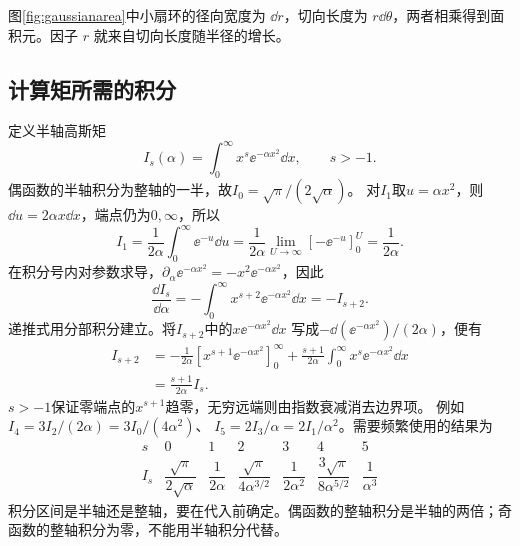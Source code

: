 图\ref{fig:gaussianarea}中小扇环的径向宽度为 $\dd r$，切向长度为 $r\dd\theta$，两者相乘得到面积元。因子 $r$ 就来自切向长度随半径的增长。

\subsection{计算矩所需的积分}
\label{th:integrals}
定义半轴高斯矩
\[
 I_s(\alpha)=\int_0^\infty x^s\ee^{-\alpha x^2}\dd x,\qquad s>-1.
\]
偶函数的半轴积分为整轴的一半，故$I_0=\sqrt\pi/(2\sqrt\alpha)$。
对$I_1$取$u=\alpha x^2$，则$\dd u=2\alpha x\dd x$，端点仍为$0,\infty$，所以
\[
 I_1=\frac1{2\alpha}\int_0^\infty\ee^{-u}\dd u
 =\frac1{2\alpha}\lim_{U\to\infty}[-\ee^{-u}]_0^U
 =\frac1{2\alpha}.
\]
在积分号内对参数求导，$\partial_\alpha\ee^{-\alpha x^2}=-x^2\ee^{-\alpha x^2}$，因此
\[
 \frac{\dd I_s}{\dd\alpha}
 =-\int_0^\infty x^{s+2}\ee^{-\alpha x^2}\dd x=-I_{s+2}.
\]
递推式用分部积分建立。将$I_{s+2}$中的$x\ee^{-\alpha x^2}\dd x$
写成$-\dd(\ee^{-\alpha x^2})/(2\alpha)$，便有
\[
 \begin{aligned}
 I_{s+2}&=-\frac1{2\alpha}
 [x^{s+1}\ee^{-\alpha x^2}]_0^\infty
 +\frac{s+1}{2\alpha}\int_0^\infty x^s\ee^{-\alpha x^2}\dd x\\
 &=\frac{s+1}{2\alpha}I_s.
 \end{aligned}
\]
$s>-1$保证零端点的$x^{s+1}$趋零，无穷远端则由指数衰减消去边界项。
例如$I_4=3I_2/(2\alpha)=3I_0/(4\alpha^2)$、
$I_5=2I_3/\alpha=2I_1/\alpha^2$。需要频繁使用的结果为
\[
 \begin{array}{c|cccccc}
 s&0&1&2&3&4&5\\ \hline
 I_s&\dfrac{\sqrt\pi}{2\sqrt\alpha}&\dfrac1{2\alpha}&
 \dfrac{\sqrt\pi}{4\alpha^{3/2}}&\dfrac1{2\alpha^2}&
 \dfrac{3\sqrt\pi}{8\alpha^{5/2}}&\dfrac1{\alpha^3}
 \end{array}
\]
积分区间是半轴还是整轴，要在代入前确定。偶函数的整轴积分是半轴的两倍；奇函数的整轴积分为零，不能用半轴积分代替。

